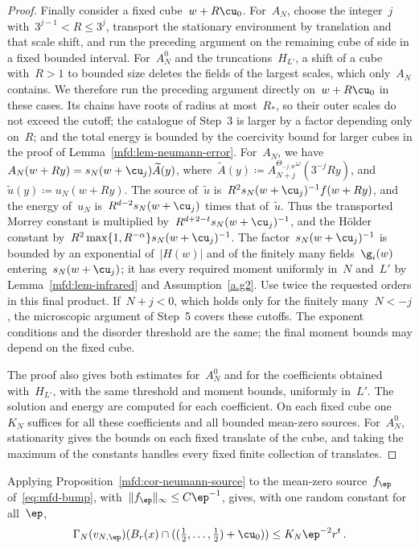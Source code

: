 \documentclass[11pt]{amsart}
\begin{document}
\begin{proof}
Finally consider a fixed cube~$w+R\cu_0$. For~$A_N$, choose the integer~$j$ with~$3^{j-1}<R\leq3^j$, transport the stationary environment by translation and that scale shift, and run the preceding argument on the remaining cube of side in a fixed bounded interval. For~$A_N^0$ and the truncations~$H_{L'}$, a shift of a cube with~$R>1$ to bounded size deletes the fields of the largest scales, which only~$A_N$ contains. We therefore run the preceding argument directly on~$w+R\cu_0$ in these cases. Its chains have roots of radius at most~$R_*$, so their outer scales do not exceed the cutoff; the catalogue of Step~3 is larger by a factor depending only on~$R$; and the total energy is bounded by the coercivity bound for larger cubes in the proof of Lemma~\ref{mfd:lem-neumann-error}. For~$A_N$, we have~$A_N(w+Ry)=s_N(w+\cu_j)\widetilde A(y)$, where~$\widetilde A(y)\coloneqq A_{N+j}^{\Theta_{-j,w}\omega}(3^{-j}Ry)$, and~$\widetilde u(y)\coloneqq u_N(w+Ry)$. The source of~$\widetilde u$ is~$R^2s_N(w+\cu_j)^{-1}f(w+Ry)$, and the energy of~$u_N$ is~$R^{d-2}s_N(w+\cu_j)$ times that of~$\widetilde u$. Thus the transported Morrey constant is multiplied by~$R^{d+2-t}s_N(w+\cu_j)^{-1}$, and the H\"older constant by~$R^2\max\{1,R^{-\alpha}\}s_N(w+\cu_j)^{-1}$. The factor~$s_N(w+\cu_j)^{-1}$ is bounded by an exponential of~$|H(w)|$ and of the finitely many fields~$\g_i(w)$ entering~$s_N(w+\cu_j)$; it has every required moment uniformly in~$N$ and~$L'$ by Lemma~\ref{mfd:lem-infrared} and Assumption~\ref{a.g2}. Use twice the requested orders in this final product. If~$N+j<0$, which holds only for the finitely many~$N<-j$, the microscopic argument of Step~5 covers these cutoffs. The exponent conditions and the disorder threshold are the same; the final moment bounds may depend on the fixed cube.

\smallskip

The proof also gives both estimates for~$A_N^0$ and for the coefficients obtained with~$H_{L'}$, with the same threshold and moment bounds, uniformly in~$L'$. The solution and energy are computed for each coefficient. On each fixed cube one~$K_N$ suffices for all these coefficients and all bounded mean-zero sources. For~$A_N^0$, stationarity gives the bounds on each fixed translate of the cube, and taking the maximum of the constants handles every fixed finite collection of translates.
\end{proof}

Applying Proposition~\ref{mfd:cor-neumann-source} to the mean-zero source~$f_\ep$ of~\eqref{eq:mfd-bump}, with~$\|f_\ep\|_\infty\leq C\ep^{-1}$, gives, with one random constant for all~$\ep$,
\begin{equation}
	\Gamma_N(v_{N,\ep})(B_r(x)\cap((\tfrac12,\dots,\tfrac12)+\cu_0))
	\leq K_N\ep^{-2}r^t\,.
	\label{eq:mfd-13}
\end{equation}
\end{document}
